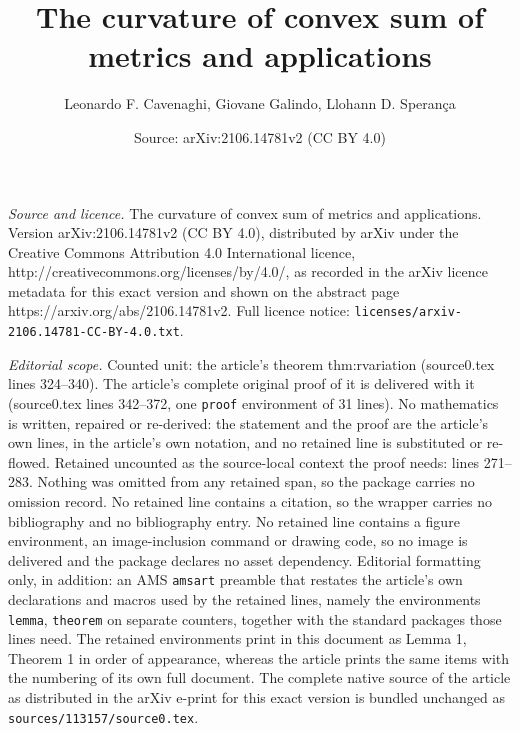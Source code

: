 \documentclass[10pt,a4paper]{amsart}
\title{The curvature of convex sum of metrics and applications}
\author{Leonardo F. Cavenaghi, Giovane Galindo, Llohann D. Speran\c{c}a}
\date{Source: arXiv:2106.14781v2 (CC BY 4.0)}
\begin{document}
\maketitle

\noindent\emph{Source and licence.} The curvature of convex sum of metrics and applications. Version arXiv:2106.14781v2 (CC BY 4.0), distributed by arXiv under the Creative Commons Attribution 4.0 International licence, http://creativecommons.org/licenses/by/4.0/, as recorded in the arXiv licence metadata for this exact version and shown on the abstract page https://arxiv.org/abs/2106.14781v2. Full licence notice: \texttt{licenses/arxiv-2106.14781-CC-BY-4.0.txt}.\par\smallskip

\noindent\textit{Editorial scope.} Counted unit: the article's theorem thm:rvariation (source0.tex lines 324--340). The article's complete original proof of it is delivered with it (source0.tex lines 342--372, one \texttt{proof} environment of 31 lines). No mathematics is written, repaired or re-derived: the statement and the proof are the article's own lines, in the article's own notation, and no retained line is substituted or re-flowed.  Retained uncounted as the source-local context the proof needs: lines 271--283.  Nothing was omitted from any retained span, so the package carries no omission record.  No retained line contains a citation, so the wrapper carries no bibliography and no bibliography entry.  No retained line contains a figure environment, an image-inclusion command or drawing code, so no image is delivered and the package declares no asset dependency.  Editorial formatting only, in addition: an AMS \texttt{amsart} preamble that restates the article's own declarations and macros used by the retained lines, namely the environments \texttt{lemma}, \texttt{theorem} on separate counters, together with the standard packages those lines need.  The retained environments print in this document as Lemma 1, Theorem 1 in order of appearance, whereas the article prints the same items with the numbering of its own full document.  The complete native source of the article as distributed in the arXiv e-print for this exact version is bundled unchanged as \texttt{sources/113157/source0.tex}.
\end{document}
